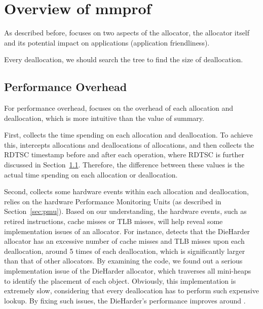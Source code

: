 \section{Overview of mmprof}

As described before, \MP{} focuses on two aspects of the allocator, the allocator itself and its potential impact on applications (application friendliness). 

Every deallocation, we should search the tree to find the size of deallocation. 
\subsection{Performance Overhead}

For performance overhead, \MP{} focuses on the overhead of each allocation and deallocation, which is more intuitive than the value of summary. 

First, \MP{} collects the time spending on each allocation and deallocation. To achieve this, \MP{} intercepts allocations and deallocations of allocations, and then collects the RDTSC timestamp before and after each operation, where RDTSC is further discussed in Section~\ref{}. Therefore, the difference between these values is the actual time spending on each allocation or deallocation.


% 

Second, \MP{} collects some hardware events within each allocation and deallocation, relies on the hardware Performance Monitoring Units (as described in Section~\ref{sec:pmu}). Based on our understanding, the hardware events, such as retired instructions, cache misses or TLB misses, will help reveal some implementation issues of an allocator. For instance, \MP{} detects that the DieHarder allocator has an excessive number of cache misses and TLB misses upon each deallocation, around 5 times of each deallocation, which is significantly larger than that of other allocators. By examining the code, we found out a serious implementation issue of the DieHarder allocator, which traverses all mini-heaps to identify the placement of each object. Obviously, this implementation is extremely slow, considering that every deallocation has to perform such expensive lookup. By fixing such issues, the DieHarder's performance improves around .     


